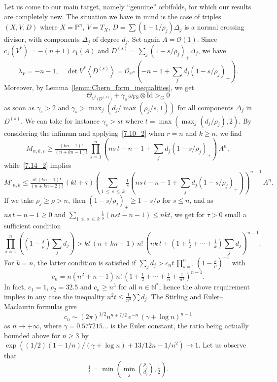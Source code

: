 \documentclass[AHL,Unicode,longabstracts,published]{cedram}
\newcommand*\Id{\mathrm{Id}}
\newcommand*\FS{\mathrm{FS}}
\newcommand*\cO{\mathcal{O}}
\newcommand*\bN{\mathbb{N}}
\newcommand*\bP{\mathbb{P}}
\let\leq\leqslant
\let\geq\geqslant
\begin{document}
Let us come to our main target, namely ``genuine'' orbifolds, for which our results are completely new. The situation we have in mind is the case of triples $(X,V,D)$ where $X=\bP^n$, $V=T_X$, $D=\sum (1-1/\rho_j)\Delta_j$ is a normal crossing divisor, with components $\Delta_j$ of degree $d_j$. Set again $A=\cO(1)$. Since $c_1(V^*)=-(n+1)\,c_1(A)$ and $D^{(s)}=\sum_j(1-s/\rho_j)_+\Delta_j$, we have
\[
\lambda_V=-n-1,\quad \det V^*\left\langle D^{(s)}\right\rangle =
\cO_{\bP^n}\left(-n-1+\sum_j d_j\left(1-s/\rho_j\right)_+\right).
\]
Moreover, by {Lemma}~\ref{lemm:Chern_form_inequalities}, we get
\[
\Theta_{V^*\langle D^{(s)}\rangle}+\gamma_s\,\omega_\FS\otimes\Id>_G0
\]
as soon as $\gamma_s>2$ and
$\gamma_s>\max_j(d_j/\max(\rho_j/s,1))$ for all components $\Delta_j$ in $D^{(s)}$. We can take for instance
$\gamma_s>st$ where $t=\max(\max_j(d_j/\rho_j),2)$. By considering the infimum and applying~\eqref{7.10_2} when $r=n$ and $k\geq n$, we find
\[
M_{n,k,\varepsilon}\geq\tfrac{(kn-1)!}{(n+kn-1)!}\,
\prod_{s=1}^n\left(ns\,t-n-1+\sum_j d_j\left(1-s/\rho_j\right)_+\right)\,A^n,
\]
while~\eqref{7.14_2} implies
\begin{equation}\label{7.25}
M'_{n,k}\leq\tfrac{n!\,(kn-1)!}{(n+kn-2)!}\, (kt+\tau)
\left(\sum_{1\,\leq\,s\,\leq\,k}\tfrac{1}{ s}\left(ns\,t-n-1+\sum_jd_j\left(1-s/\rho_j\right)_+
\right)\right)^{n-1}\,A^n.
\end{equation}
If we take $\rho_j\geq\rho>n$, then $(1-s/\rho_j)_+\geq 1-s/\rho$ for $s\leq n$, and as $ns\,t-n-1\geq 0$ and $\sum_{1\,\leq\,s\,\leq\,k}\tfrac{1}{ s}(nst-n-1)\leq nkt$, we get for $\tau>0$ small a sufficient condition
\[
\prod_{s=1}^n\left(\left(1-\tfrac{s}{ \rho}\right)\sum_jd_j\right)> kt\,(n+kn-1)\,n!\,
\left(nk\,t+\left(1+\tfrac{1}{ 2}+\cdots+\tfrac{1}{ k}\right)\sum_jd_j\right)^{n-1}.
\]
For $k=n$, the latter condition is satisfied if
$\sum_j d_j>c_nt\,\prod_{s=1}^n(1-\tfrac{s}{\rho})^{-1}$ with
\[
c_n=n\left(n^2+n-1\right)\,n!\,
\left(1+\tfrac{1}{ 2}+\cdots+\tfrac{1}{ n}+\tfrac{1}{ n^3}\right)^{n-1}.
\]
In fact, $c_1=1$, $c_2=32.5$ and $c_n\geq n^5$ for all $n\in\bN^*$, hence the above requirement implies in any case the inequality $n^2t\leq \tfrac{1}{ n^3}\sum d_j$. The Stirling and Euler--Maclaurin formulas give
\[
c_n\sim (2\pi)^{1/2} n^{n+7/2}\,e^{-n}\,(\gamma+\log n)^{n-1}
\]
as $n\to+\infty$, where $\gamma=0.577215\ldots$ is the Euler constant, the ratio being actually bounded above for $n\geq 3$ by
$\exp((1/2)(1-1/n)/(\gamma+\log n)+13/12n-1/n^2)\to 1$. Let us observe that
\[
\tfrac{1}{ t}=\min\left(\!\min_j\left(\tfrac{\rho_j}{ d_j}\right),\tfrac{1}{ 2}\right).
\]
\end{document}
